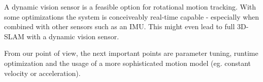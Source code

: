 A dynamic vision sensor is a feasible option for rotational motion tracking. With
some optimizations the system is conceiveably real-time capable - especially
when combined with other sensors such as an IMU. This might even lead to full
3D-SLAM with a dynamic vision sensor.

From our point of view, the next important points are parameter tuning, runtime
optimization and the usage of a more sophisticated motion model (eg. constant
velocity or acceleration).
